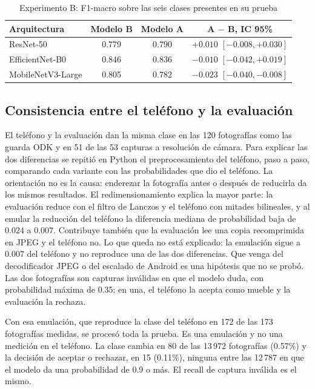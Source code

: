 \documentclass[conference]{IEEEtran}
\begin{document}
\begin{table}[t]
\caption{Experimento B: F1-macro sobre las seis clases presentes en su prueba}
\label{tab:temporal}
\centering
\setlength{\tabcolsep}{3.5pt}
\begin{tabular}{@{}lccc@{}}
\toprule
Arquitectura & Modelo B & Modelo A & A $-$ B, IC 95\% \\
\midrule
ResNet-50 & 0.779 & 0.790 & $+0.010$ $[-0.008, +0.030]$ \\
EfficientNet-B0 & 0.846 & 0.836 & $-0.010$ $[-0.042, +0.019]$ \\
MobileNetV3-Large & 0.805 & 0.782 & $-0.023$ $[-0.040, -0.008]$ \\
\bottomrule
\end{tabular}
\end{table}

\subsection{Consistencia entre el teléfono y la evaluación}

El teléfono y la evaluación dan la misma clase en las 120 fotografías como las guarda ODK y en 51 de las 53
capturas a resolución de cámara. Para explicar las dos diferencias se repitió en Python el preprocesamiento del
teléfono, paso a paso, comparando cada variante con las probabilidades que dio el teléfono. La orientación no es
la causa: enderezar la fotografía antes o después de reducirla da los mismos resultados. El redimensionamiento
explica la mayor parte: la evaluación reduce con el filtro de Lanczos y el teléfono con mitades bilineales, y al
emular la reducción del teléfono la diferencia mediana de probabilidad baja de 0.024 a 0.007. Contribuye también
que la evaluación lee una copia recomprimida en JPEG y el teléfono no. Lo que queda no está explicado: la
emulación sigue a 0.007 del teléfono y no reproduce una de las dos diferencias. Que venga del decodificador JPEG o
del escalado de Android es una hipótesis que no se probó. Las dos fotografías son capturas inválidas en que el
modelo duda, con probabilidad máxima de 0.35; en una, el teléfono la acepta como mueble y la evaluación la rechaza.

Con esa emulación, que reproduce la clase del teléfono en 172 de las 173 fotografías medidas, se procesó toda la
prueba. Es una emulación y no una medición en el teléfono. La clase cambia en 80 de las 13\,972 fotografías
(0.57\%) y la decisión de aceptar o rechazar, en 15 (0.11\%), ninguna entre las 12\,787 en que el modelo da una
probabilidad de 0.9 o más. El recall de captura inválida es el mismo.
\end{document}
